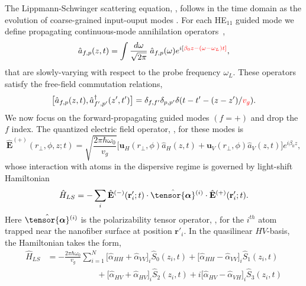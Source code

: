 \documentclass[preprint,aps,pra,onecolumn]{revtex4-1} %
\newcommand{\poltens}{\hat{\tensor{\boldsymbol{\alpha}}}}
\newcommand{\change}[1]{{\color{RoyalBlue} #1}}
\newcommand{\error}[1]{{\color{red} #1}}
\begin{document}
The Lippmann-Schwinger scattering equation, , follows in the time domain as the evolution of \error{coarse-grained} input-ouput modes \cite{gardiner_input_1985, fan_input-output_2010}.  For each HE$_{11}$ guided mode we define propagating continuous-mode annihilation operators~\cite{blow_continuum_1990, le_kien_correlations_2008},
	\begin{align}
		\hat{a}_{f,p}(z,t) = \int \frac{d \omega}{\sqrt{2 \pi}} \; \hat{a}_{f,p}(\omega) e^{i[ \error{\beta_0 z- (\omega-\omega_L) t ]}}, 
	\end{align}
\change{that are slowly-varying with respect to the probe frequency $\omega_L$.} These operators satisfy the free-field commutation relations,
\change{
	\begin{equation}
		\big[\hat{a}_{f,p}(z,t),\hat{a}^\dag_{f',p'}(z',t')\big]=\delta_{f,f'}\delta_{p,p'}  \delta(t-t'-(z-z')/\error{v_g}).
	\end{equation}
}
We now focus on the forward-propagating guided modes $(f=+)$ and drop the $f$ index. The quantized electric field operator, , for these modes is
\begin{equation}
\hat{\mathbf{E}}^{(+)}(r\!_\perp,\phi,z;t) = \sqrt{ \frac{2 \pi \hbar \omega_0}{ v_g} } \big[ \mathbf{u}_H(r\!_\perp,\phi) \hat{a}_H(z,t) + \mathbf{u}_V(r\!_\perp,\phi) \hat{a}_V(z,t) \big] e^{i \beta_0 z},
\end{equation}
whose interaction with atoms in the dispersive regime is governed by  light-shift Hamiltonian~\cite{deutsch_quantum_2010,kien_dynamical_2013}
\begin{equation}  
	\hat{H}_{LS}   = - \sum_i \hat{\mathbf{E}}^{(-)}(\mathbf{r}'_i ; t ) \cdot \poltens\phantom{}^{(i)} \cdot \hat{\mathbf{E}}^{(+)}(\mathbf{r}'_i;t ).
\end{equation}
Here $\poltens\phantom{}^{(i)}$ is the polarizability tensor operator, , for the $i^{th}$ atom trapped near the nanofiber surface at position $\mathbf{r}'_i$. In the quasilinear $HV$-basis, the Hamiltonian takes the form,
\begin{align}  
	\hat{H}_{LS} & = -\frac{2 \pi \hbar \omega_0}{v_g} \sum_{i=1}^N   \big[\hat{\alpha}_{HH}+\hat{\alpha}_{VV} \big]_i \hat{S}_0(z_i,t) +  \big[\hat{\alpha}_{HH}-\hat{\alpha}_{VV} \big]_i \hat{S}_1(z_i,t) \label{Eq::GenHamiltonian} \\
	&\quad \quad \quad \quad \quad \quad+ \big[\hat{\alpha}_{HV}+\hat{\alpha}_{HV} \big]_i \hat{S}_2(z_i,t) + i  \big[\hat{\alpha}_{HV}-\hat{\alpha}_{VH} \big]_i \hat{S}_3(z_i,t)  \nonumber
	\end{align}
\end{document}
